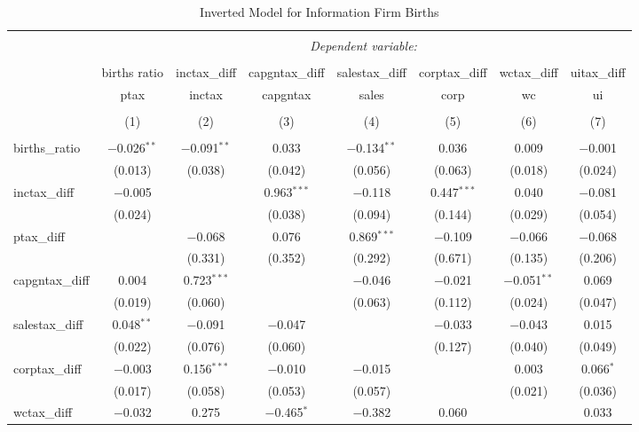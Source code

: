 
\begin{table}[!htbp] \centering 
  \caption{Inverted Model for  Information Firm Births} 
  \label{51rd} 
\footnotesize 
\begin{tabular}{@{\extracolsep{5pt}}lccccccc} 
\\[-1.8ex]\hline 
\hline \\[-1.8ex] 
 & \multicolumn{7}{c}{\textit{Dependent variable:}} \\ 
\cline{2-8} 
\\[-1.8ex] & births ratio & inctax\_diff & capgntax\_diff & salestax\_diff & corptax\_diff & wctax\_diff & uitax\_diff \\ 
 & ptax & inctax & capgntax & sales & corp & wc & ui \\ 
\\[-1.8ex] & (1) & (2) & (3) & (4) & (5) & (6) & (7)\\ 
\hline \\[-1.8ex] 
 births\_ratio & $-$0.026$^{**}$ & $-$0.091$^{**}$ & 0.033 & $-$0.134$^{**}$ & 0.036 & 0.009 & $-$0.001 \\ 
  & (0.013) & (0.038) & (0.042) & (0.056) & (0.063) & (0.018) & (0.024) \\ 
  inctax\_diff & $-$0.005 &  & 0.963$^{***}$ & $-$0.118 & 0.447$^{***}$ & 0.040 & $-$0.081 \\ 
  & (0.024) &  & (0.038) & (0.094) & (0.144) & (0.029) & (0.054) \\ 
  ptax\_diff &  & $-$0.068 & 0.076 & 0.869$^{***}$ & $-$0.109 & $-$0.066 & $-$0.068 \\ 
  &  & (0.331) & (0.352) & (0.292) & (0.671) & (0.135) & (0.206) \\ 
  capgntax\_diff & 0.004 & 0.723$^{***}$ &  & $-$0.046 & $-$0.021 & $-$0.051$^{**}$ & 0.069 \\ 
  & (0.019) & (0.060) &  & (0.063) & (0.112) & (0.024) & (0.047) \\ 
  salestax\_diff & 0.048$^{**}$ & $-$0.091 & $-$0.047 &  & $-$0.033 & $-$0.043 & 0.015 \\ 
  & (0.022) & (0.076) & (0.060) &  & (0.127) & (0.040) & (0.049) \\ 
  corptax\_diff & $-$0.003 & 0.156$^{***}$ & $-$0.010 & $-$0.015 &  & 0.003 & 0.066$^{*}$ \\ 
  & (0.017) & (0.058) & (0.053) & (0.057) &  & (0.021) & (0.036) \\ 
  wctax\_diff & $-$0.032 & 0.275 & $-$0.465$^{*}$ & $-$0.382 & 0.060 &  & 0.033 \\ 

\end{tabular}
\end{table}
